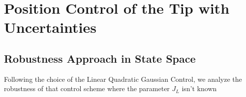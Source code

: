 \chapter{Position Control of the Tip with Uncertainties}
\label{cha:position_tip_uncertanties}

    \section{Robustness Approach in State Space}

        Following the choice of the Linear Quadratic Gaussian Control, we analyze the robustness of that control scheme where the parameter $J_L$ isn't known